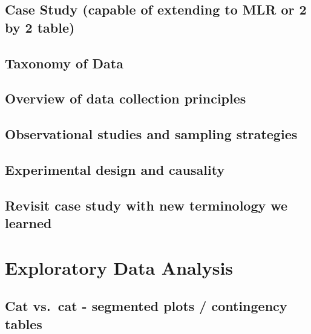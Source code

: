 \documentclass[]{book}
\begin{document}
\hypertarget{case-study-capable-of-extending-to-mlr-or-2-by-2-table}{%
\section{Case Study (capable of extending to MLR or 2 by 2 table)}\label{case-study-capable-of-extending-to-mlr-or-2-by-2-table}}

\hypertarget{taxonomy-of-data}{%
\section{Taxonomy of Data}\label{taxonomy-of-data}}

\hypertarget{overview-of-data-collection-principles}{%
\section{Overview of data collection principles}\label{overview-of-data-collection-principles}}

\hypertarget{observational-studies-and-sampling-strategies}{%
\section{Observational studies and sampling strategies}\label{observational-studies-and-sampling-strategies}}

\hypertarget{experimental-design-and-causality}{%
\section{Experimental design and causality}\label{experimental-design-and-causality}}

\hypertarget{revisit-case-study-with-new-terminology-we-learned}{%
\section{Revisit case study with new terminology we learned}\label{revisit-case-study-with-new-terminology-we-learned}}

\hypertarget{eda}{%
\chapter{Exploratory Data Analysis}\label{eda}}

\hypertarget{cat-vs.cat---segmented-plots-contingency-tables}{%
\section{Cat vs.~cat - segmented plots / contingency tables}\label{cat-vs.cat---segmented-plots-contingency-tables}}
\end{document}
